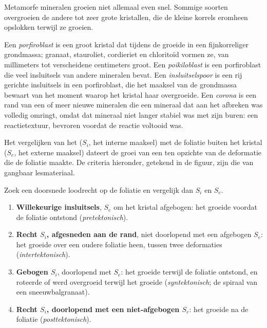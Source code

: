 Metamorfe mineralen groeien niet allemaal even snel. Sommige soorten overgroeien de andere tot zeer grote kristallen,
die de kleine korrels eromheen opslokken terwijl ze groeien.

\begin{definition}\label{def:b2:field-lab-methods-2:porphyroblast}
Een \emph{porfiroblast} is een groot kristal dat tijdens de  groeide
in een fijnkorreliger grondmassa; granaat, stauroliet, cordieriet en chloritoïd vormen ze, van
millimeters tot verscheidene centimeters groot. Een \emph{poikiloblast} is een
porfiroblast die veel insluitsels van andere mineralen bevat. Een
\emph{insluitselspoor} is een rij gerichte insluitsels in een porfiroblast, die
het maaksel van de grondmassa bewaart van het moment waarop het kristal haar overgroeide. Een
\emph{corona} is een rand van een of meer nieuwe mineralen die een mineraal dat aan het
afbreken was volledig omringt, omdat dat mineraal niet langer stabiel was met zijn
buren: een reactietextuur, bevroren voordat de reactie voltooid was.
\end{definition}

Het vergelijken van het  ($S_i$, het interne maaksel) met de foliatie buiten het kristal
($S_e$, het externe maaksel) dateert de groei van een  ten opzichte van de deformatie die
de foliatie maakte. De criteria hieronder, getekend in de figuur, zijn die van gangbaar lesmateriaal.

\begin{method}\label{met:b2:field-lab-methods-2:timing}
Zoek een doorsnede loodrecht op de foliatie en vergelijk dan $S_i$ en $S_e$.
\begin{enumerate}
  \item \textbf{Willekeurige insluitsels}, $S_e$ om het kristal afgebogen: het groeide voordat de
        foliatie ontstond (\emph{pretektonisch}).
  \item \textbf{Recht $S_i$, afgesneden aan de rand}, niet doorlopend met een afgebogen $S_e$: het groeide
        over een oudere foliatie heen, tussen twee deformaties (\emph{intertektonisch}).
  \item \textbf{Gebogen $S_i$}, doorlopend met $S_e$: het groeide terwijl de foliatie ontstond, en roteerde
        of werd overgroeid terwijl het groeide (\emph{syntektonisch}; de spiraal van een sneeuwbalgranaat).
  \item \textbf{Recht $S_i$, doorlopend met een niet-afgebogen $S_e$}: het groeide na de foliatie
        (\emph{posttektonisch}).
\end{enumerate}
\end{method}

